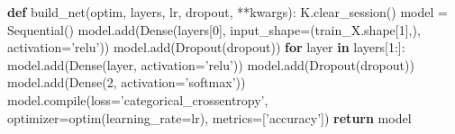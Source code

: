 \documentclass[]{article}
\newenvironment{Shaded}{}{}
\newcommand{\BuiltInTok}[1]{#1}
\newcommand{\ControlFlowTok}[1]{\textcolor[rgb]{0.00,0.44,0.13}{\textbf{#1}}}
\newcommand{\DecValTok}[1]{\textcolor[rgb]{0.25,0.63,0.44}{#1}}
\newcommand{\KeywordTok}[1]{\textcolor[rgb]{0.00,0.44,0.13}{\textbf{#1}}}
\newcommand{\NormalTok}[1]{#1}
\newcommand{\OperatorTok}[1]{\textcolor[rgb]{0.40,0.40,0.40}{#1}}
\newcommand{\StringTok}[1]{\textcolor[rgb]{0.25,0.44,0.63}{#1}}
\begin{document}
\begin{Shaded}
\begin{Highlighting}[]
\KeywordTok{def}\NormalTok{ build_net(optim, layers, lr, dropout, }\OperatorTok{**}\NormalTok{kwargs):}
\NormalTok{    K.clear_session()}
\NormalTok{    model }\OperatorTok{=}\NormalTok{ Sequential()}
\NormalTok{    model.add(Dense(layers[}\DecValTok{0}\NormalTok{], input_shape}\OperatorTok{=}\NormalTok{(train_X.shape[}\DecValTok{1}\NormalTok{],), activation}\OperatorTok{=}\StringTok{'relu'}\NormalTok{))}
\NormalTok{    model.add(Dropout(dropout))}
    \ControlFlowTok{for}\NormalTok{ layer }\KeywordTok{in}\NormalTok{ layers[}\DecValTok{1}\NormalTok{:]:}
\NormalTok{        model.add(Dense(layer, activation}\OperatorTok{=}\StringTok{'relu'}\NormalTok{))}
\NormalTok{        model.add(Dropout(dropout))}
\NormalTok{    model.add(Dense(}\DecValTok{2}\NormalTok{, activation}\OperatorTok{=}\StringTok{'softmax'}\NormalTok{))}
\NormalTok{    model.}\BuiltInTok{compile}\NormalTok{(loss}\OperatorTok{=}\StringTok{'categorical_crossentropy'}\NormalTok{, optimizer}\OperatorTok{=}\NormalTok{optim(learning_rate}\OperatorTok{=}\NormalTok{lr), metrics}\OperatorTok{=}\NormalTok{[}\StringTok{'accuracy'}\NormalTok{]) }
    \ControlFlowTok{return}\NormalTok{ model}
\end{Highlighting}
\end{Shaded}
\end{document}
